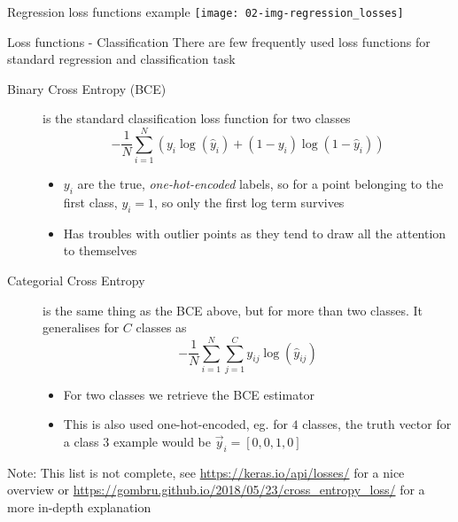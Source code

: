    \begin{frame}{Regression loss functions example}
        \texttt{[image: 02-img-regression\_losses]}
    \end{frame}

    \begin{frame}{Loss functions - Classification}
      \enlargethispage{1cm}
      There are few frequently used loss functions for standard regression and classification task
      \begin{description}
        \item[Binary Cross Entropy (BCE)] is the standard classification loss function for two classes
          \begin{equation*}
            - \frac{1}{N} \sum_{i=1}^N \left(
              y_i \log(\hat{y}_i) + (1 - y_i) \log(1 - \hat{y}_i) \right)
          \end{equation*}
          \begin{itemize}
            \item $y_i$ are the true, \emph{one-hot-encoded} labels, so for a point belonging to the first class, $y_i = 1$, so only the first log term survives
            \item Has troubles with outlier points as they tend to draw all the attention to themselves
          \end{itemize}
        \item[Categorial Cross Entropy] is the same thing as the BCE above, but for more than two classes.
        It generalises for $C$ classes as
          \begin{equation*}
            - \frac{1}{N}\sum_{i=1}^N \sum_{j=1}^C y_{ij} \log(\hat{y}_{ij})
          \end{equation*}
          \begin{itemize}
            \item For two classes we retrieve the BCE estimator
            \item This is also used one-hot-encoded, eg. for $4$ classes, the truth vector for a class $3$ example would be $\vec{y}_i = [0, 0, 1, 0]$
          \end{itemize}
      \end{description}
      Note: This list is not complete, see \url{https://keras.io/api/losses/} for a nice overview or \url{https://gombru.github.io/2018/05/23/cross_entropy_loss/} for a more in-depth explanation
    \end{frame}

